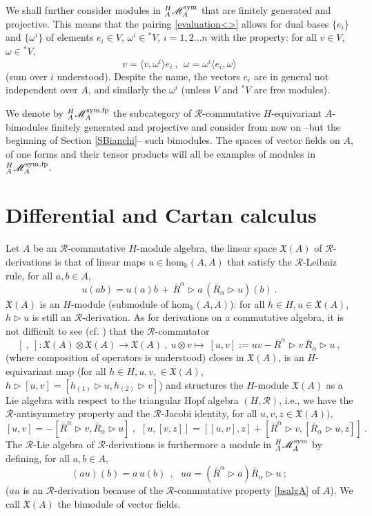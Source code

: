 \documentclass[12pt]{article}
\numberwithin{equation}{section}
\theoremstyle{plain}
\theoremstyle{definition}
\theoremstyle{remark}
\def\Vect{\mathfrak{X}}
\def\MMM{\mathscr{M}}
\def\ra{\triangleright}
\def\RA{\ra}
\def\RR{\mathcal{R}}
\def\le{\langle}
\def\re{\rangle}
\def\le{\langle}
\def\re{\rangle}
\def\AA{A}
\def\sym{{\rm{sym}}}
\def\oR{\bar R}
\def\al{\alpha}
\def\cat{{{}^H_\AA\MMM_\AA^\sym}}
\def\catfp{{{}^H_\AA\MMM_\AA^{\sym, \rm{fp}}}}
\def\hom{\mathrm{hom}}
\begin{document}
We shall further consider modules in $\cat$ that are finitely generated
and projective. This means that the pairing \eqref{evaluation<>}
allows for dual bases
$\{e_i\}$ and $\{\omega^i\}$ of elements $e_i\in V$,
$\omega^i\in {}^*V$, $i=1,2\ldots n$ with the property:
for all $v\in V$, $\omega\in {}^*V$,
$$v=\le v ,\omega^i\re
e_i~,~~\omega=\omega^i\le e_i,\omega\re$$
(sum over $i$ understood). Despite the name, the
vectors $e_i$ are in general not independent over $A$, and similarly the $\omega^i$ (unless
$V$ and ${}^*V$ are free modules).

We denote by $\catfp$ the
subcategory of  ${\mathcal{R}}$-commutative $H$-equivariant $A$-bimodules finitely generated
and projective and consider from now on --but the beginning of Section \ref{SBianchi}-- such bimodules. The spaces of
vector fields on $A$, of one forms and their tensor products will all be examples of  modules in $\catfp$. 

\section{Differential and Cartan calculus}\label{sectCC}

Let $A$ be an  ${\mathcal{R}}$-commutative $H$-module algebra, the linear space  $\Vect(A)$ of
 ${\mathcal{R}}$-derivations  is that of linear maps $u\in
\hom_\Bbbk(\AA,\AA)$ that satisfy the ${\mathcal{R}}$-Leibniz rule, for all $a,b\in A$,
\begin{equation}\label{braidedleibniz}
u(ab)=u(a)b\,+\,\oR^\alpha\ra a \,(\oR_\alpha \RA u)(b)~.
\end{equation}
$\Vect(A)$  is an $H$-module (submodule of
$\hom_\Bbbk(\AA,\AA)$): for all $h\in H, u\in \Vect(A)$, $h\ra u$
is still an  ${\mathcal{R}}$-derivation.
As for derivations on a commutative algebra, it is not difficult to see
(cf. \cite[Lemma 3.1]{Weber}) that the  ${\mathcal{R}}$-commutator
$$[~,~]: \Vect(A)\otimes \Vect(A)\to \Vect(A)~,~u\otimes v\mapsto
~[u,v]:=u v-{\oR}^\al\ra v\,{\oR}_\al\ra u~,$$
(where composition of operators is understood) closes in
$\Vect(A)$, is an $H$-equivariant map (for all $h
\in H, u,v, \in  \Vect(A)$, $h\ra [u,v]=[h_{(1)}\ra u,h_{(2)}\ra v]$)
and structures the $H$-module  $\Vect(A)$ as a Lie
 algebra with respect to the triangular Hopf algebra $(H, \RR)$, i.e., we have the  ${\mathcal{R}}$-antisymmetry property and the
  ${\mathcal{R}}$-Jacobi identity, for all $u,v,z\in \Vect(A))$,
\begin{equation}\label{brLie}
[u,v]=-[{\oR}^\al \ra v,{\oR}_\al \ra u]~,~~
[u,[v,z]]=[[u,v],z]+[{\oR}^\al \ra v,[{\oR}_\al\ra u,z]]~.
\end{equation}
 The ${\mathcal{R}}$-Lie algebra of ${\mathcal{R}}$-derivations is furthermore a module in ${}^{H}_\AA\MMM_\AA^\sym$
by defining, for all $a,b\in A$, 
\begin{equation}\label{aub}
(au)(b)=a\,u(b)~~,~~~ua=(\oR^\al\ra a)\oR_\al\ra u~;
\end{equation}
($au$ is an  ${\mathcal{R}}$-derivation because of the  ${\mathcal{R}}$-commutative
property \eqref{bsalgA} of $A$). %
We call $\Vect(A)$  the bimodule
of vector fields.
\\
\end{document}
